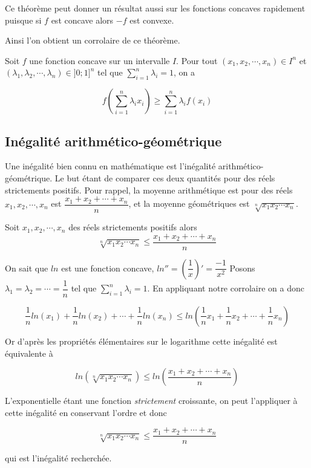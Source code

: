 \documentclass[french]{book}
\newcommand{\se}{\geq}
\newcommand{\ie}{\leq}
\begin{document}
Ce théorème peut donner un résultat aussi sur les fonctions concaves rapidement puisque si $f$ est concave alors $-f$ est convexe. 

Ainsi l'on obtient un corrolaire de ce théorème.

\begin{cor}
Soit $f$ une fonction concave sur un intervalle $I$. Pour tout $(x_1,x_2, \cdots , x_n) \in I^n $ et $(\lambda_1,\lambda_2, \cdots , \lambda_n) \in ]0;1]^n $ tel que $\sum_{i=1}^n \lambda_i =1$, on a

$$f(\sum_{i=1}^{n} \lambda_i x_i) \se \sum_{i=1}^n \lambda_i f(x_i)$$
\end{cor}

\newpage

\subsection{Inégalité arithmético-géométrique }

Une inégalité bien connu en mathématique est l'inégalité arithmético-géométrique. Le but étant de comparer ces deux quantités pour des réels strictements positifs. Pour rappel, la moyenne arithmétique est pour des réels $x_1,x_2, \cdots , x_n$ est $\dfrac{x_1+x_2+\cdots+x_n}{n}$, et la moyenne géométriques est $\sqrt[n]{x_1x_2\cdots x_n}$.

\begin{thm}
Soit  $x_1,x_2, \cdots , x_n$ des réels strictements positifs alors 
$$\sqrt[n]{x_1x_2\cdots x_n} \ie \dfrac{x_1+x_2+\cdots+x_n}{n} $$
\end{thm}

\begin{demo}
On sait que $ln$ est une fonction concave, \emph{$ln''=(\dfrac{1}{x})'=\dfrac{-1}{x^2}$}  Posons $\lambda_1=\lambda_2=\cdots=\dfrac{1}{n}$ tel que $\sum_{i=1}^{n} \lambda_i =1$. En appliquant notre corrolaire on a donc 

$$\dfrac{1}{n} ln(x_1) + \dfrac{1}{n} ln(x_2) + \cdots +\dfrac{1}{n} ln(x_n) \ie ln( \dfrac{1}{n}x_1 +\dfrac{1}{n}x_2 + \cdots + \dfrac{1}{n}x_n )$$

Or d'après les propriétés élémentaires sur le logarithme cette inégalité est équivalente à

$$ln(\sqrt[n]{x_1x_2\cdots x_n}) \ie ln( \dfrac{x_1+x_2+\cdots+x_n}{n} )$$

L'exponentielle étant une fonction \emph{strictement} croissante, on peut l'appliquer à cette inégalité en conservant l'ordre et donc 

$$\sqrt[n]{x_1x_2\cdots x_n} \ie \dfrac{x_1+x_2+\cdots+x_n}{n} $$

qui est l'inégalité recherchée.
\end{demo}
\end{document}

